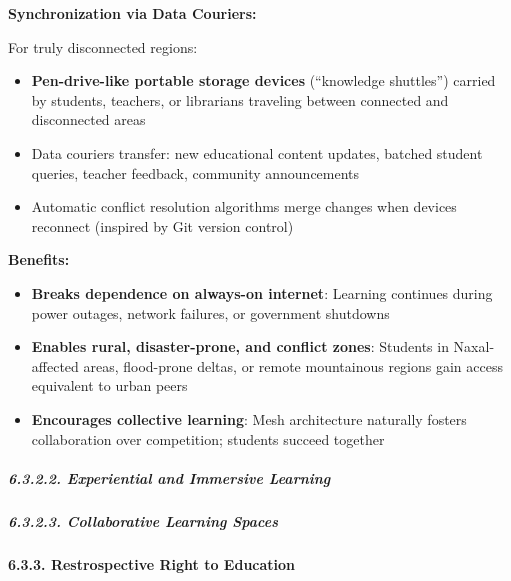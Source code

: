 \textbf{Synchronization via Data Couriers:}

For truly disconnected regions:

\begin{itemize}
\tightlist
\item
  \textbf{Pen-drive-like portable storage devices} (``knowledge
  shuttles'') carried by students, teachers, or librarians traveling
  between connected and disconnected areas
\item
  Data couriers transfer: new educational content updates, batched
  student queries, teacher feedback, community announcements
\item
  Automatic conflict resolution algorithms merge changes when devices
  reconnect (inspired by Git version control)
\end{itemize}

\textbf{Benefits:}

\begin{itemize}
\tightlist
\item
  \textbf{Breaks dependence on always-on internet}: Learning continues
  during power outages, network failures, or government shutdowns
\item
  \textbf{Enables rural, disaster-prone, and conflict zones}: Students
  in Naxal-affected areas, flood-prone deltas, or remote mountainous
  regions gain access equivalent to urban peers
\item
  \textbf{Encourages collective learning}: Mesh architecture naturally
  fosters collaboration over competition; students succeed together
\end{itemize}

\subparagraph{6.3.2.2. Experiential and Immersive
Learning}\label{experiential-and-immersive-learning}

\subparagraph{6.3.2.3. Collaborative Learning
Spaces}\label{collaborative-learning-spaces}

\paragraph{6.3.3. Restrospective Right to
Education}\label{restrospective-right-to-education}

